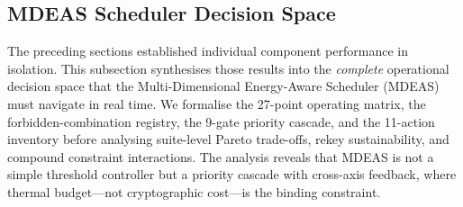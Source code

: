 
\subsection{MDEAS Scheduler Decision Space}
\label{sec:scheduler}

The preceding sections established individual component performance in
isolation.  This subsection synthesises those results into the
\emph{complete} operational decision space that the Multi-Dimensional
Energy-Aware Scheduler (MDEAS) must navigate in real time.  We formalise
the 27-point operating matrix, the forbidden-combination registry, the
9-gate priority cascade, and the 11-action inventory before analysing
suite-level Pareto trade-offs, rekey sustainability, and compound
constraint interactions.  The analysis reveals that MDEAS is not a
simple threshold controller but a priority cascade with cross-axis
feedback, where thermal budget---not cryptographic cost---is the binding
constraint.

